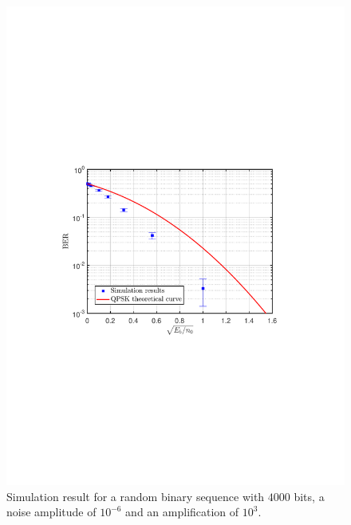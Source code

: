 \begin{figure}[h]
	\centering
	\includegraphics[clip, trim=0.5cm 9cm 0.5cm 9cm, width=\textwidth]{./sdf/m_qam_system/figures/BER_QPSK_sim_pseudorandom7_Eb_n0.pdf}
	\caption{Simulation result for a random binary sequence with $4000$ bits, a noise amplitude of $10^{-6}$ and an amplification of $10^3$.}
	\label{fig:ber_pseudorandom}
\end{figure}%